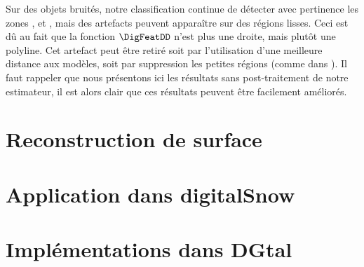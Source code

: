 Sur des objets bruités, notre classification continue de détecter avec pertinence les zones \featedge, \featsmooth et \featflat, mais des artefacts peuvent apparaître sur des régions lisses. Ceci est dû au fait que la fonction $\DigFeatDD$ n'est plus une droite, mais plutôt une polyline. Cet artefact peut être retiré soit par l'utilisation d'une meilleure distance aux modèles, soit par suppression les petites régions \featedge (comme dans \cite{Park2012}). Il faut rappeler que nous présentons ici les résultats sans post-traitement de notre estimateur, il est alors clair que ces résultats peuvent être facilement améliorés.

\section{Reconstruction de surface}
\label{sec:applications:reconstruction}

\section{Application dans digitalSnow}
\label{sec:applications:digitalsnow}

\section{Implémentations dans DGtal}
\label{sec:applications:dgtal}
